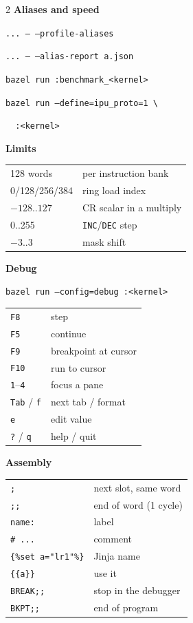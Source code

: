 \documentclass[11pt,a4paper]{article}
\begin{document}
\begin{tcolorbox}[enhanced, colback=white, colframe=muted, boxrule=0.8pt, arc=4pt,
  left=10pt, right=10pt, top=8pt, bottom=10pt]
{\begin{multicols}{2}
\medskip\textbf{\sffamily Aliases and speed}\par
\texttt{... -- --profile-aliases}\par
\texttt{... -- --alias-report a.json}\par
\texttt{bazel run :benchmark\_<kernel>}\par
\texttt{bazel run --define=ipu\_proto=1 \textbackslash}\par
\texttt{\ \ :<kernel>}\par

\medskip\textbf{\sffamily Limits}\par
\begin{tabular}{@{}ll@{}}
128 words & per instruction bank \\
0/128/256/384 & ring load index \\
$-128$..$127$ & CR scalar in a multiply \\
0..255 & \texttt{INC}/\texttt{DEC} step \\
$-3$..$3$ & mask shift \\
\end{tabular}\par
\columnbreak
\textbf{\sffamily Debug}\par
\texttt{bazel run --config=debug :<kernel>}\par\smallskip
\begin{tabular}{@{}ll@{}}
\texttt{F8} & step \\
\texttt{F5} & continue \\
\texttt{F9} & breakpoint at cursor \\
\texttt{F10} & run to cursor \\
\texttt{1}--\texttt{4} & focus a pane \\
\texttt{Tab} / \texttt{f} & next tab / format \\
\texttt{e} & edit value \\
\texttt{?} / \texttt{q} & help / quit \\
\end{tabular}

\medskip\textbf{\sffamily Assembly}\par
\begin{tabular}{@{}ll@{}}
\texttt{;} & next slot, same word \\
\texttt{;;} & end of word (1 cycle) \\
\texttt{name:} & label \\
\texttt{\# ...} & comment \\
\texttt{\{\%set a="lr1"\%\}} & Jinja name \\
\texttt{\{\{a\}\}} & use it \\
\texttt{BREAK;;} & stop in the debugger \\
\texttt{BKPT;;} & end of program \\
\end{tabular}


\end{multicols}}
\end{tcolorbox}
\end{document}
